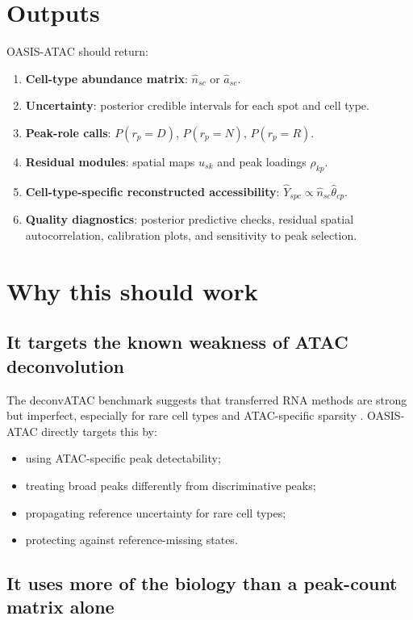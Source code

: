 \documentclass[11pt]{article}
\begin{document}
\section{Outputs}

OASIS-ATAC should return:

\begin{enumerate}
    \item \textbf{Cell-type abundance matrix}: $\hat{n}_{sc}$ or $\hat{a}_{sc}$.
    \item \textbf{Uncertainty}: posterior credible intervals for each spot and cell type.
    \item \textbf{Peak-role calls}: $P(r_p=D)$, $P(r_p=N)$, $P(r_p=R)$.
    \item \textbf{Residual modules}: spatial maps $u_{sk}$ and peak loadings $\rho_{kp}$.
    \item \textbf{Cell-type-specific reconstructed accessibility}: $\hat{Y}_{spc}\propto \hat{n}_{sc}\hat{\theta}_{cp}$.
    \item \textbf{Quality diagnostics}: posterior predictive checks, residual spatial autocorrelation, calibration plots, and sensitivity to peak selection.
\end{enumerate}

\section{Why this should work}

\subsection{It targets the known weakness of ATAC deconvolution}

The deconvATAC benchmark suggests that transferred RNA methods are strong but imperfect, especially for rare cell types and ATAC-specific sparsity \cite{ouologuem2025deconvatac}. OASIS-ATAC directly targets this by:
\begin{itemize}
    \item using ATAC-specific peak detectability;
    \item treating broad peaks differently from discriminative peaks;
    \item propagating reference uncertainty for rare cell types;
    \item protecting against reference-missing states.
\end{itemize}

\subsection{It uses more of the biology than a peak-count matrix alone}
\end{document}
